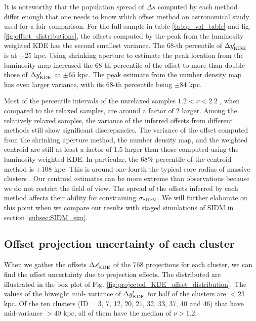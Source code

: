 It is noteworthy that the population spread of $\Delta s$ computed by each method 
differ enough that one needs to know which offset method an astronomical study
used for a fair comparison. 
For the full sample in table \ref{tab:p_val_table} and fig. 
\ref{fig:offset_distributions},
the offsets computed by the peak from the luminosity weighted KDE 
has the second smallest variance. The 68-th percentile of $\Delta y_{\rm
KDE}'$ is at $\pm 25$ kpc. Using shrinking aperture to estimate
the peak location from the luminosity map increased the 68-th percentile of the
offset to more than double those of $\Delta y_{\rm KDE}'$ at $\pm 65$ kpc.
The peak estimate from the number density map has even larger variance, 
with its 68-th percentile being $\pm 84$ kpc. 

Most of the percentile intervals of the unrelaxed samples $ 1.2 < \nu < 2.2$ , 
when compared to the relaxed samples, are around a factor of 2 larger. 
Among the relatively relaxed samples, the variance of the inferred offsets from different
methods still show significant discrepancies. 
The variance of the offset computed from the shrinking aperture method, 
the number density map, and the weighted centroid are still at least a factor of 1.5
larger than those computed using the luminosity-weighted KDE. 
In particular, the 68\% percentile of the centroid method is $\pm 108$ kpc.
This is around one-fourth the typical core radius of massive clusters
\citep{Allen1998}. Our centroid estimates can be more extreme than observations
because we do not restrict the field of view.
 The spread of the offsets inferred by each method affects their ability
for constraining $\sigma_{\rm SIDM}$. We will further elaborate on this point
when we compare our results with staged simulations of SIDM in section
\ref{subsec:SIDM_sim}. 


\subsection{Offset projection uncertainty of each cluster}
When we gather the offsets $\Delta s_{\rm KDE}'$ of the 
768 projections for each cluster,
we can find the offset uncertainty due to projection effects.
The distributed are illustrated in the box plot of Fig. 
\ref{fig:projected_KDE_offset_distribution}. The values of the biweight mid-
variance of $\Delta y_{\rm KDE}'$ for half of the clusters
are $< 23$ kpc. Of the ten clusters (ID = 3, 7, 12, 20, 21, 32, 33, 37, 40 and 46) 
that have mid-variance $ > 40$ kpc, all of them have the median of $\nu > 1.2$.
 
